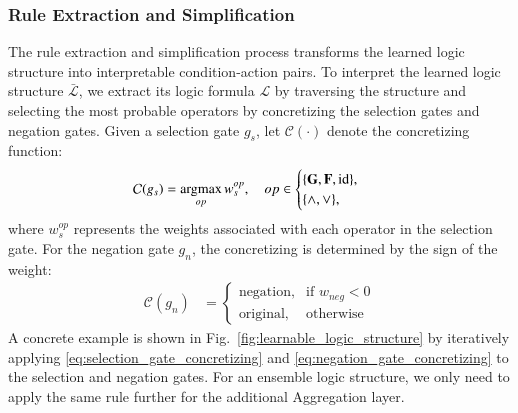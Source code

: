\subsubsection{Rule Extraction and Simplification}
\label{sec:rule_extraction_and_simplification}

The rule extraction and simplification process transforms the learned logic structure into interpretable condition-action pairs. To interpret the learned logic structure $\bar{\mathcal{L}}$, we extract its logic formula $\mathcal{L}$ by traversing the structure and selecting the most probable operators by concretizing the selection gates and negation gates. Given a selection gate $g_s$, let $\mathcal{C}(\cdot)$ denote the concretizing function:
\begin{equation}
    \begin{aligned}
        \mathcal{C}(g_s) & = \mathop{\mathrm{argmax}}_{op} w^{op}_s, \quad op \in \begin{cases}
                                                                     \{\mathbf{G}, \mathbf{F}, \text{id}\}, \\
                                                                     \{\land, \lor\},
                                                                 \end{cases}
    \end{aligned}
    \label{eq:selection_gate_concretizing}
\end{equation}
where $w^{op}_s$ represents the weights associated with each operator in the selection gate.
For the negation gate $g_n$, the concretizing is determined by the sign of the weight:
\begin{equation}
    \begin{aligned}
        \mathcal{C}(g_n) & = \begin{cases}
                                 \text{negation}, & \text{if } w_{neg} < 0 \\
                                 \text{original}, & \text{otherwise}
                             \end{cases}
    \end{aligned}
    \label{eq:negation_gate_concretizing}
\end{equation}
A concrete example is shown in Fig.~\ref{fig:learnable_logic_structure} by iteratively applying \eqref{eq:selection_gate_concretizing} and \eqref{eq:negation_gate_concretizing} to the selection and negation gates. For an ensemble logic structure, we only need to apply the same rule further for the additional Aggregation layer.

